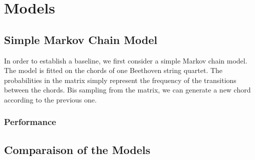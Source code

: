 \section{Models}

\subsection{Simple Markov Chain Model}
In order to establish a baseline, we first consider a simple Markov chain model. The model is fitted on the chords of one Beethoven string quartet.
The probabilities in the matrix simply represent the frequency of the transitions between the chords. Bis sampling from the matrix, we can generate a new chord according to the previous one. 

\subsubsection{Performance}

\subsection{Comparaison of the Models}
